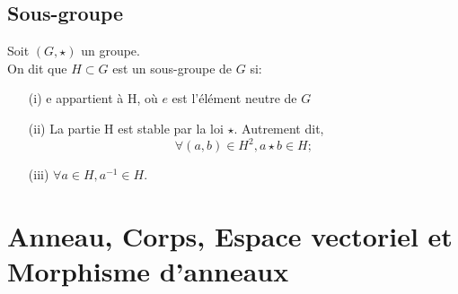 \subsection{Sous-groupe}
\begin{madefinition}
	Soit $(G, \star)$ un groupe. \\
	On dit que $H \subset G$ est un sous-groupe de $G$ si:
	\begin{enumerate}
		\item[(i)] e appartient à H, où $e$ est l'élément neutre de $G$
		\item[(ii)] La partie H est stable par la loi $\star$. Autrement dit, 
		\[\forall (a,b) \in H^2, a \star b \in H;\]
		\item[(iii)] $\forall a \in H, a^{-1} \in H$.
	\end{enumerate}
\end{madefinition}

\section{Anneau, Corps, Espace vectoriel et Morphisme d'anneaux}
